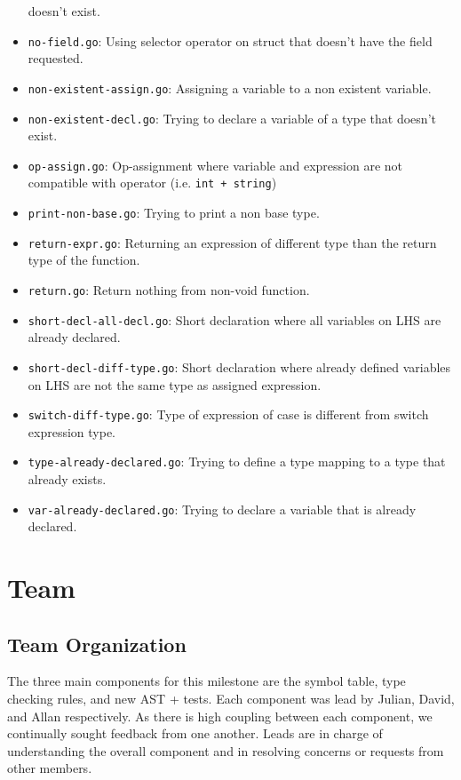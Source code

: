 \documentclass[11pt]{article}
\begin{document}
\begin{itemize}
doesn't exist.
\item \texttt{no-field.go}: Using selector operator on struct that doesn't have
the field requested.
\item \texttt{non-existent-assign.go}: Assigning a variable to a non existent
variable.
\item \texttt{non-existent-decl.go}: Trying to declare a variable of a type that
doesn't exist.
\item \texttt{op-assign.go}: Op-assignment where variable and expression are not
compatible with operator (i.e. \texttt{int + string})
\item \texttt{print-non-base.go}: Trying to print a non base type.
\item \texttt{return-expr.go}: Returning an expression of different type than the
return type of the function.
\item \texttt{return.go}: Return nothing from non-void function.
\item \texttt{short-decl-all-decl.go}: Short declaration where all variables on
LHS are already declared.
\item \texttt{short-decl-diff-type.go}: Short declaration where already defined
variables on LHS are not the same type as assigned expression.
\item \texttt{switch-diff-type.go}: Type of expression of case is different from
switch expression type.
\item \texttt{type-already-declared.go}: Trying to define a type mapping to a
type that already exists.
\item \texttt{var-already-declared.go}: Trying to declare a variable that is
already declared.
\end{itemize}
\section{Team}
\label{sec:orgb484db0}
\subsection{Team Organization}
\label{sec:orge17ae2f}
The three main components for this milestone are the symbol table,
type checking rules, and new AST + tests.  Each component was lead
by Julian, David, and Allan respectively. As there is high coupling
between each component, we continually sought feedback from one
another. Leads are in charge of understanding the overall component
and in resolving concerns or requests from other members.
\end{document}
